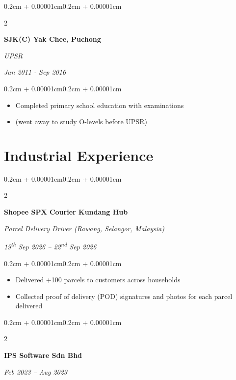 \documentclass[10pt, letterpaper]{article}
\newenvironment{highlights}{
    \begin{itemize}[
        topsep=0.10cm,
        parsep=0.10cm,
        partopsep=0pt,
        itemsep=0pt,
        leftmargin=0.4cm + 10pt
    ]
}{
    \end{itemize}
}
\newenvironment{onecolentry}{
    \begin{adjustwidth}{0.2cm + 0.00001cm}{0.2cm + 0.00001cm}
}{
    \end{adjustwidth}
}
\newenvironment{twocolentry}[2][]{
    \onecolentry
    \def\secondColumn{#2}
    \setcolumnwidth{\fill, 5.2cm}
    \begin{paracol}{2}
}{
    \switchcolumn \raggedleft \secondColumn
    \end{paracol}
    \endonecolentry
}
\newenvironment{projectentry}{
    \needspace{2.5\baselineskip}
}{
}
\newenvironment{firstprojectentry}{
    \needspace{2\baselineskip}
}{
}
\begin{document}
    \vspace{0.2cm}

    \begin{projectentry}
    \begin{twocolentry}{
        \textit{Jan 2011 - Sep 2016}
    }
        \textbf{SJK(C) Yak Chee, Puchong}

        \textit{UPSR}
    \end{twocolentry}
    \vspace{0.10cm}
    \begin{onecolentry}
        \begin{highlights}
            \item Completed primary school education with examinations
            \item (went away to study O-levels before UPSR)
        \end{highlights}
    \end{onecolentry}
    \end{projectentry}

    \section{Industrial Experience}

    \begin{firstprojectentry}
    \begin{twocolentry}{
        \textit{19\textsuperscript{th} Sep 2026 -- 22\textsuperscript{nd} Sep 2026}
    }
        \textbf{Shopee SPX Courier Kundang Hub}

        \textit{Parcel Delivery Driver (Rawang, Selangor, Malaysia)}
    \end{twocolentry}
    \vspace{0.10cm}
    \begin{onecolentry}
        \begin{highlights}
            \item Delivered +100 parcels to customers across households
            \item Collected proof of delivery (POD) signatures and photos for each parcel delivered
        \end{highlights}
    \end{onecolentry}
    \end{firstprojectentry}

    \vspace{0.4cm}

    \begin{projectentry}
    \begin{twocolentry}{
        \textit{Feb 2023 -- Aug 2023}
    }
        \textbf{IPS Software Sdn Bhd}
    \end{twocolentry}
    \end{projectentry}
\end{document}

